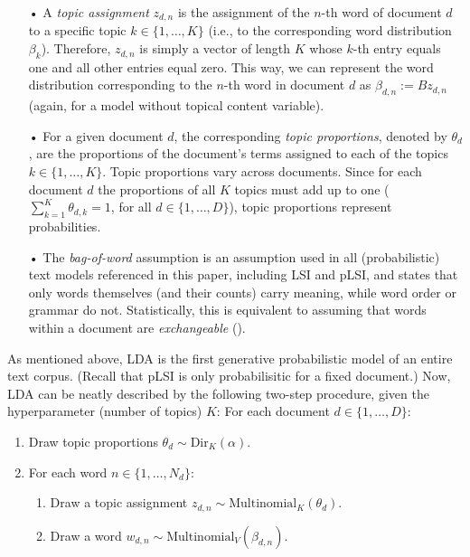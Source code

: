 \begin{itemize}
\vspace{-0.25cm}
\item[•] A \textit{topic assignment} $z_{d,n}$ is the assignment of the $n$-th word of document $d$ to a specific topic $k \in \{1,\dots,K\}$ (i.e., to the corresponding word distribution $\beta_k$). Therefore, $z_{d,n}$ is simply a vector of length $K$ whose $k$-th entry equals one and all other entries equal zero. This way, we can represent the word distribution corresponding to the $n$-th word in document $d$ as $\beta_{d,n}:=Bz_{d,n}$ (again, for a model without topical content variable).
\vspace{-0.25cm}
\item[•] For a given document $d$, the corresponding \textit{topic proportions}, denoted by $\theta_d$, are the proportions of the document's terms assigned to each of the topics $k \in \{1,\dots,K\}$. Topic proportions vary across documents. Since for each document $d$ the proportions of all $K$ topics must add up to one ($\sum_{k=1}^{K}\theta_{d,k}=1$, for all $d \in \{1,\dots,D\}$), topic proportions represent probabilities.
\vspace{-0.25cm}
\item[•] The \textit{bag-of-word} assumption is an assumption used in all (probabilistic) text models referenced in this paper, including LSI and pLSI, and states that only words themselves (and their counts) carry meaning, while word order or grammar do not. Statistically, this is equivalent to assuming that words within a document are \textit{exchangeable} (\citealp{aldous1985exchangeability}).

\end{itemize}

As mentioned above, LDA is the first generative probabilistic model of an entire text corpus. (Recall that pLSI is only probabilisitic for a fixed document.) Now, LDA can be neatly described by the following two-step procedure, given the hyperparameter (number of topics) $K$:
\vspace{0.25cm}
\noindent
For each document $d \in \{1,\dots,D\}$:

\begin{enumerate}[{1)}]
\vspace{-0.25cm}
\item Draw topic proportions $\theta_d \sim \text{Dir}_K(\alpha)$.
\vspace{-0.25cm}
\item For each word $n \in \{1,\dots,N_d\}$:
	\begin{enumerate}[{a)}]
	\vspace{-0.25cm}    
    \item Draw a topic assignment $z_{d,n} \sim \text{Multinomial}_K(\theta_d)$.
	\vspace{-0.25cm}    
    \item Draw a word $w_{d,n} \sim \text{Multinomial}_V(\beta_{d,n})$.
	\end{enumerate}
\end{enumerate}

